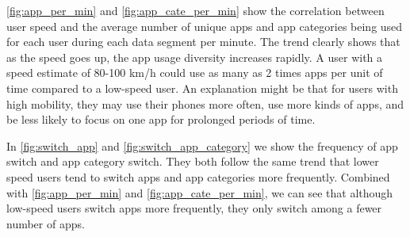 
\autoref{fig:app_per_min} and \autoref{fig:app_cate_per_min} 
show the correlation between user speed and the average number of unique apps and app categories being used for each user during each data segment per minute.
The trend clearly shows that as the speed goes up, the app usage diversity increases rapidly.
A user with a speed estimate of 80-100 km/h could use as many as 2 times apps per unit of time compared to a low-speed user.
An explanation might be that for users with high mobility, they may use their phones more often, use more kinds of apps, and be less likely to focus on one app for prolonged periods of time. 


In 
\autoref{fig:switch_app} and \autoref{fig:switch_app_category} 
we show the frequency of app switch and app category switch. They both follow the same trend that lower speed users tend to switch apps and app categories more frequently. Combined with 
\autoref{fig:app_per_min} and \autoref{fig:app_cate_per_min}, %
we can see that although low-speed users switch apps more frequently, they only switch among a fewer number of apps.

